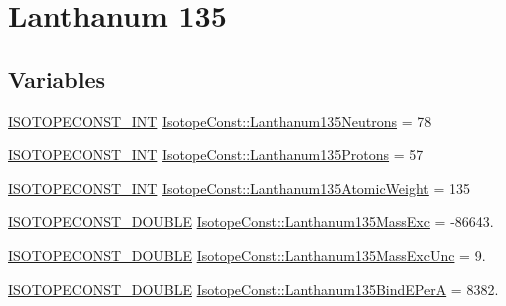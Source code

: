\hypertarget{group___isotope_const-_lanthanum-_la135}{}\section{Lanthanum 135}
\label{group___isotope_const-_lanthanum-_la135}
\subsection*{Variables}
\begin{DoxyCompactItemize}
\item 
\mbox{\hyperlink{group___isotope_const-_macros_ga5f18360b3e99483a35c32d789e62621c}{I\+S\+O\+T\+O\+P\+E\+C\+O\+N\+S\+T\+\_\+\+I\+NT}} \mbox{\hyperlink{group___isotope_const-_lanthanum-_la135_gac2f3a666d25d2883b18e874ec4f283b6}{Isotope\+Const\+::\+Lanthanum135\+Neutrons}} = 78
\item 
\mbox{\hyperlink{group___isotope_const-_macros_ga5f18360b3e99483a35c32d789e62621c}{I\+S\+O\+T\+O\+P\+E\+C\+O\+N\+S\+T\+\_\+\+I\+NT}} \mbox{\hyperlink{group___isotope_const-_lanthanum-_la135_ga1fb140e2a4a6e64140c1fca5edad4592}{Isotope\+Const\+::\+Lanthanum135\+Protons}} = 57
\item 
\mbox{\hyperlink{group___isotope_const-_macros_ga5f18360b3e99483a35c32d789e62621c}{I\+S\+O\+T\+O\+P\+E\+C\+O\+N\+S\+T\+\_\+\+I\+NT}} \mbox{\hyperlink{group___isotope_const-_lanthanum-_la135_ga3317252d60321d65a2b050af4e556fa2}{Isotope\+Const\+::\+Lanthanum135\+Atomic\+Weight}} = 135
\item 
\mbox{\hyperlink{group___isotope_const-_macros_ga8f45a7272ce02c0b4c65c44636ed719a}{I\+S\+O\+T\+O\+P\+E\+C\+O\+N\+S\+T\+\_\+\+D\+O\+U\+B\+LE}} \mbox{\hyperlink{group___isotope_const-_lanthanum-_la135_ga69240dda939e1fb1664a5174e4aa983c}{Isotope\+Const\+::\+Lanthanum135\+Mass\+Exc}} = -\/86643.
\item 
\mbox{\hyperlink{group___isotope_const-_macros_ga8f45a7272ce02c0b4c65c44636ed719a}{I\+S\+O\+T\+O\+P\+E\+C\+O\+N\+S\+T\+\_\+\+D\+O\+U\+B\+LE}} \mbox{\hyperlink{group___isotope_const-_lanthanum-_la135_ga1c834f15e14448dbfd3c2c6b8ec422f9}{Isotope\+Const\+::\+Lanthanum135\+Mass\+Exc\+Unc}} = 9.
\item 
\mbox{\hyperlink{group___isotope_const-_macros_ga8f45a7272ce02c0b4c65c44636ed719a}{I\+S\+O\+T\+O\+P\+E\+C\+O\+N\+S\+T\+\_\+\+D\+O\+U\+B\+LE}} \mbox{\hyperlink{group___isotope_const-_lanthanum-_la135_ga54f95eb129f4b883d8f274ed7cff060d}{Isotope\+Const\+::\+Lanthanum135\+Bind\+E\+PerA}} = 8382.
\item 

\end{DoxyCompactItemize}
